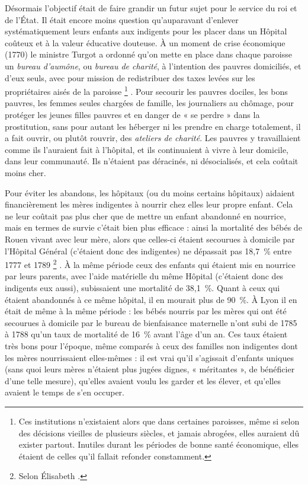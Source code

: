  Désormais l'objectif était de faire grandir un futur sujet pour le service du roi et de l'État. Il était encore moins question qu'auparavant d'enlever systématiquement leurs enfants aux indigents pour les placer dans un Hôpital coûteux et à la valeur éducative douteuse. À un moment de crise économique (1770) le ministre Turgot a ordonné qu'on mette en place dans chaque paroisse un \emph{bureau d'aumône}, ou \emph{bureau de charité}, à l'intention des pauvres domiciliés, et d'eux seuls, avec pour mission de redistribuer des taxes levées sur les propriétaires aisés de la paroisse%
\footnote{Ces institutions n'existaient alors que dans certaines paroisses, même si selon des décisions vieilles de plusieurs siècles, et jamais abrogées, elles auraient dû exister partout. Inutiles durant les périodes de bonne santé économique, elles étaient de celles qu'il fallait refonder constamment.}%
. Pour secourir les pauvres dociles, les bons pauvres, les femmes seules chargées de famille, les journaliers au chômage, pour protéger les jeunes filles pauvres et en danger de « se perdre » dans la prostitution, sans pour autant les héberger ni les prendre en charge totalement, il a fait ouvrir, ou plutôt rouvrir, des \emph{ateliers de charité}. Les pauvres y travaillaient comme ils l'auraient fait à l'hôpital, et ils continuaient à vivre à leur domicile, dans leur communauté. Ils n'étaient pas déracinés, ni désocialisés, et cela coûtait moins cher. 

 Pour éviter les abandons, les hôpitaux (ou du moins certains hôpitaux) aidaient financièrement les mères indigentes à nourrir chez elles leur propre enfant. Cela ne leur coûtait pas plus cher que de mettre un enfant abandonné en nourrice, mais en termes de survie c'était bien plus efficace : ainsi la mortalité des bébés de Rouen vivant avec leur mère, alors que celles-ci étaient secourues à domicile par l'Hôpital Général (c'étaient donc des indigentes) ne dépassait pas 18,7~\% entre 1777 et 1789%
\footnote{Selon Élisabeth .}%
. À la même période ceux des enfants qui étaient mis en nourrice par leurs parents, avec l'aide matérielle du même Hôpital (c'étaient donc des indigents eux aussi), subissaient une mortalité de 38,1~\%. Quant à ceux qui étaient abandonnés à ce même hôpital, il en mourait plus de 90~\%. À Lyon il en était de même à la même période : les bébés nourris par les mères qui ont été secourues à domicile par le bureau de bienfaisance maternelle n'ont subi de 1785 à 1788 qu'un taux de mortalité de 16~\% avant l'âge d'un an. Ces taux étaient très bons pour l'époque, même comparés à ceux des familles non indigentes dont les mères nourrissaient elles-mêmes : il est vrai qu'il s'agissait d'enfants uniques (sans quoi leurs mères n'étaient plus jugées dignes, « méritantes », de bénéficier d'une telle mesure), qu'elles avaient voulu les garder et les élever, et qu'elles avaient le temps de s'en occuper.

